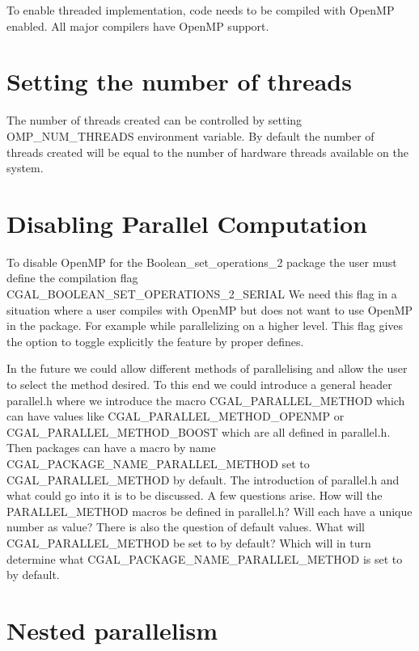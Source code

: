 To enable threaded implementation, code needs to be compiled with OpenMP enabled. All major compilers have OpenMP support.

\section{Setting the number of threads\label{sec:set_num_thread}}

The number of threads created can be controlled by setting OMP_NUM_THREADS environment variable. By default the number of threads created will be equal to the number of hardware threads available on the system.

\section{Disabling Parallel Computation\label{sec:disable_parallel}}

To disable OpenMP for the Boolean_set_operations_2 package the user must define the compilation flag CGAL_BOOLEAN_SET_OPERATIONS_2_SERIAL
We need this flag in a situation where a user compiles with OpenMP but does not want to use OpenMP in the package. For example while parallelizing on a higher level. This flag gives the option to toggle explicitly the feature by proper defines. 

In the future we could allow different methods of parallelising and allow the user to select the method desired. To this end we could introduce a general header parallel.h where we introduce the macro CGAL_PARALLEL_METHOD which can have values like CGAL_PARALLEL_METHOD_OPENMP or CGAL_PARALLEL_METHOD_BOOST which are all defined in parallel.h. Then packages can have a macro by name CGAL_PACKAGE_NAME_PARALLEL_METHOD set to CGAL_PARALLEL_METHOD by default.
The introduction of parallel.h and what could go into it is to be discussed.
A few questions arise. How will the PARALLEL_METHOD macros be defined in parallel.h? Will each have a unique number as value? There is also the question of default values. What will CGAL_PARALLEL_METHOD be set to by default? Which will in turn determine what CGAL_PACKAGE_NAME_PARALLEL_METHOD is set to by default.

\section{Nested parallelism\label{sec:nested_parallelism}}

